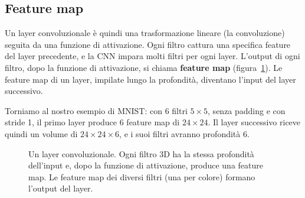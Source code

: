 \subsection{Feature map}
Un layer convoluzionale è quindi una trasformazione lineare (la convoluzione) seguita da una funzione di attivazione. Ogni filtro cattura una specifica feature del layer precedente, e la CNN impara molti filtri per ogni layer. L'output di ogni filtro, dopo la funzione di attivazione, si chiama \textbf{feature map} (figura~\ref{fig:feature-map}). Le feature map di un layer, impilate lungo la profondità, diventano l'input del layer successivo.

Torniamo al nostro esempio di MNIST: con 6 filtri $5 \times 5$, senza padding e con stride 1, il primo layer produce 6 feature map di $24 \times 24$. Il layer successivo riceve quindi un volume di $24 \times 24 \times 6$, e i suoi filtri avranno profondità 6.

\begin{figure}[htbp]
\centering
{}
\caption{Un layer convoluzionale. Ogni filtro 3D ha la stessa profondità dell'input e, dopo la funzione di attivazione, produce una feature map. Le feature map dei diversi filtri (una per colore) formano l'output del layer.}
\label{fig:feature-map}
\end{figure}


